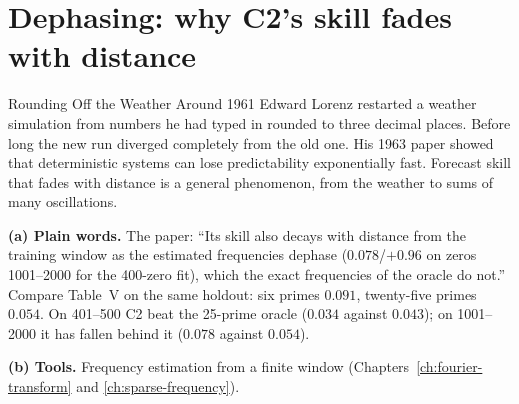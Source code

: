 \section{Dephasing: why C2's skill fades with distance}\label{sec:paper-arithmetic-dephase}
\begin{didyouknow}{Rounding Off the Weather}
Around 1961 Edward Lorenz restarted a weather simulation from numbers he had typed in rounded to three decimal places. Before long the new run diverged completely from the old one. His 1963 paper showed that deterministic systems can lose predictability exponentially fast. Forecast skill that fades with distance is a general phenomenon, from the weather to sums of many oscillations.
\end{didyouknow}

\textbf{(a) Plain words.} The paper: ``Its skill also decays with distance from the training window as the estimated frequencies dephase ($0.078$/$+0.96$ on zeros 1001--2000 for the 400-zero fit), which the exact frequencies of the oracle do not.'' Compare Table~V on the same holdout: six primes $0.091$, twenty-five primes $0.054$. On 401--500 C2 beat the 25-prime oracle ($0.034$ against $0.043$); on 1001--2000 it has fallen behind it ($0.078$ against $0.054$).

\textbf{(b) Tools.} Frequency estimation from a finite window (Chapters~\ref{ch:fourier-transform} and \ref{ch:sparse-frequency}).

